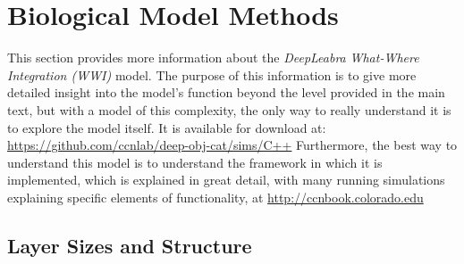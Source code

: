 \documentclass[12pt,twoside]{article}
\newif\myifpdf
\begin{document}
\section{Biological Model Methods}

This section provides more information about the {\em DeepLeabra} {\em What-Where Integration (WWI)} model.  The purpose of this information is to give more detailed insight into the model's function beyond the level provided in the main text, but with a model of this complexity, the only way to really understand it is to explore the model itself.  It is available for download at: \url{https://github.com/ccnlab/deep-obj-cat/sims/C++}  Furthermore, the best way to understand this model is to understand the framework in which it is implemented, which is explained in great detail, with many running simulations explaining specific elements of functionality, at \url{http://ccnbook.colorado.edu}

\subsection{Layer Sizes and Structure}
\end{document}
